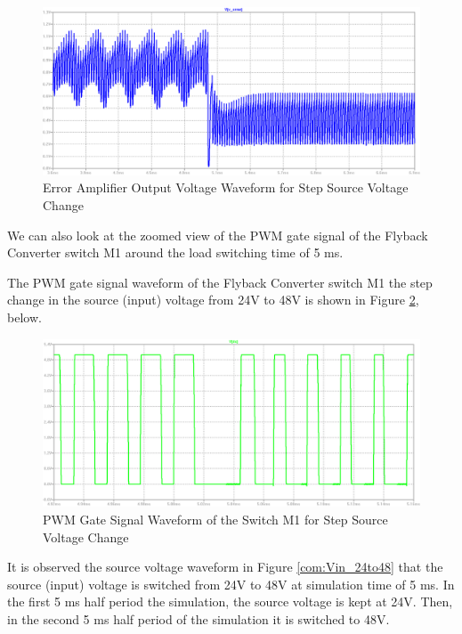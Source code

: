 \begin{figure}[H]
\begin{center}
\includegraphics[width=1\textwidth]{comp_simulations/Verror_24to48.png}
\caption{Error Amplifier Output Voltage Waveform for Step Source Voltage Change}
\label{com:Verror_24to48}
\end{center}
\end{figure}

We can also look at the zoomed view of the PWM gate signal of the Flyback Converter switch M1 around the load switching time of 5 ms.

The PWM gate signal waveform of the Flyback Converter switch M1 the step change in the source (input) voltage from 24V to 48V is shown in Figure \ref{com:dutycycle_24to48}, below.

\begin{figure}[H]
\begin{center}
\includegraphics[width=1\textwidth]{comp_simulations/dutycycle_24to48.png}
\caption{PWM Gate Signal Waveform of the Switch M1 for Step Source Voltage Change}
\label{com:dutycycle_24to48}
\end{center}
\end{figure}

It is observed the source voltage waveform in Figure \ref{com:Vin_24to48} that the source (input) voltage is switched from 24V to 48V at simulation time of 5 ms. In the first 5 ms half period the simulation, the source voltage is kept at 24V. Then, in the second 5 ms half period of the simulation it is switched to 48V.

